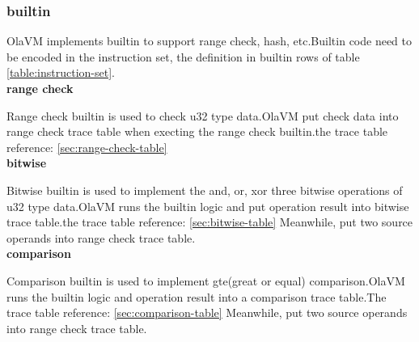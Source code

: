 \subsubsection{builtin}\label{subsec: instructions-builtin}
OlaVM implements builtin to support range check, hash, etc.Builtin code need to be encoded in the instruction set, the definition in builtin rows of table \ref{table:instruction-set}. \\
\textbf{range check}

Range check builtin is used to check u32 type data.OlaVM put check data into range check trace table when execting the range check builtin.the trace table reference: \ref{sec:range-check-table} \\
\textbf{bitwise}

Bitwise builtin is used to implement the and, or, xor three bitwise operations of u32 type data.OlaVM runs the builtin logic and put operation result into bitwise trace table.the trace table reference: \ref{sec:bitwise-table}
Meanwhile, put two source operands into range check trace table. \\
\textbf{comparison}

Comparison builtin is used to implement gte(great or equal) comparison.OlaVM runs the builtin logic and operation result into a comparison trace table.The trace table reference: \ref{sec:comparison-table}
Meanwhile, put two source operands into range check trace table.